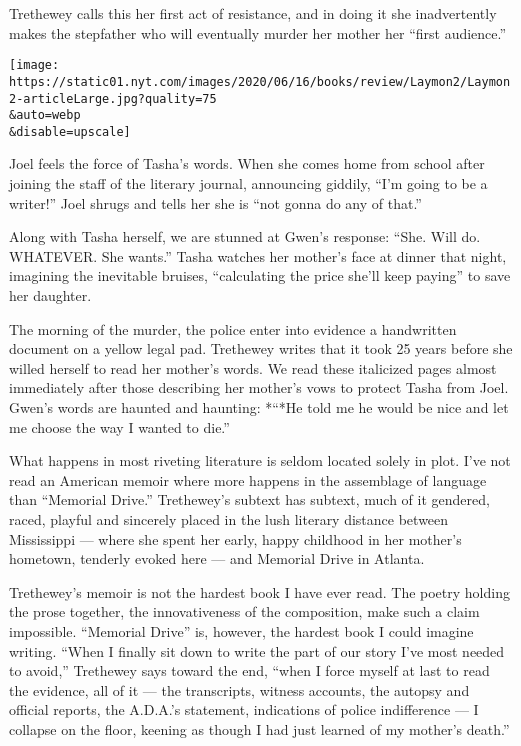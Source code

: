 Trethewey calls this her first act of resistance, and in doing it she
inadvertently makes the stepfather who will eventually murder her mother
her ``first audience.''

\texttt{[image: https://static01.nyt.com/images/2020/06/16/books/review/Laymon2/Laymon2-articleLarge.jpg?quality=75\\\&auto=webp\\\&disable=upscale]}

Joel feels the force of Tasha's words. When she comes home from school
after joining the staff of the literary journal, announcing giddily,
``I'm going to be a writer!'' Joel shrugs and tells her she is ``not
gonna do any of that.''

Along with Tasha herself, we are stunned at Gwen's response: ``She. Will
do. WHATEVER. She wants.'' Tasha watches her mother's face at dinner
that night, imagining the inevitable bruises, ``calculating the price
she'll keep paying'' to save her daughter.

The morning of the murder, the police enter into evidence a handwritten
document on a yellow legal pad. Trethewey writes that it took 25 years
before she willed herself to read her mother's words. We read these
italicized pages almost immediately after those describing her mother's
vows to protect Tasha from Joel. Gwen's words are haunted and haunting:
*``*He told me he would be nice and let me choose the way I wanted to
die.''

What happens in most riveting literature is seldom located solely in
plot. I've not read an American memoir where more happens in the
assemblage of language than ``Memorial Drive.'' Trethewey's subtext has
subtext, much of it gendered, raced, playful and sincerely placed in the
lush literary distance between Mississippi --- where she spent her
early, happy childhood in her mother's hometown, tenderly evoked here
--- and Memorial Drive in Atlanta.

Trethewey's memoir is not the hardest book I have ever read. The poetry
holding the prose together, the innovativeness of the composition, make
such a claim impossible. ``Memorial Drive'' is, however, the hardest
book I could imagine writing. ``When I finally sit down to write the
part of our story I've most needed to avoid,'' Trethewey says toward the
end, ``when I force myself at last to read the evidence, all of it ---
the transcripts, witness accounts, the autopsy and official reports, the
A.D.A.'s statement, indications of police indifference --- I collapse on
the floor, keening as though I had just learned of my mother's death.''

